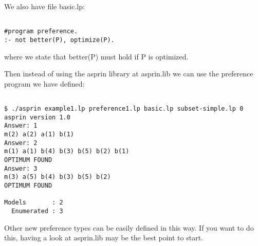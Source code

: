  We also have file basic.lp: 
\begin{verbatim}

#program preference.
:- not better(P), optimize(P).
\end{verbatim}

 where we state that better(P) must hold if P is optimized. 

 Then instead of using the asprin library at asprin.lib  we can use the preference program we have defined: 
\begin{verbatim}

$ ./asprin example1.lp preference1.lp basic.lp subset-simple.lp 0
asprin version 1.0
Answer: 1
m(2) a(2) a(1) b(1)
Answer: 2
m(1) a(1) b(4) b(3) b(5) b(2) b(1)
OPTIMUM FOUND
Answer: 3
m(3) a(5) b(4) b(3) b(5) b(2)
OPTIMUM FOUND

Models       : 2
  Enumerated : 3

\end{verbatim}

 Other new preference types can be easily defined in this way.  If you want to do this, having a look at asprin.lib may be the best point to start. 
\fi

